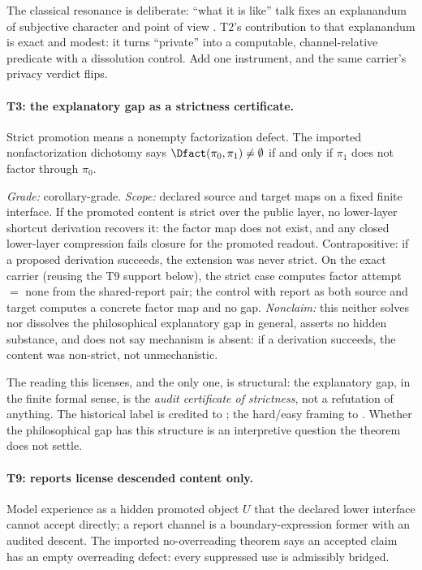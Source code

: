 The classical resonance is deliberate: ``what it is like'' talk fixes an
explanandum of subjective character and point of view \citep{Nagel1974}.
T2's contribution to that explanandum is exact and modest: it turns
``private'' into a computable, channel-relative predicate with a dissolution
control. Add one instrument, and the same carrier's privacy verdict
flips.

\paragraph{T3: the explanatory gap as a strictness certificate.}
Strict promotion means a nonempty factorization defect. The imported
nonfactorization dichotomy says $\Dfact(\pi_0, \pi_1)\neq\emptyset$ if and
only if $\pi_1$ does not factor through $\pi_0$.

\begin{theorem}
\gradeS{} \emph{Grade:} corollary-grade. \emph{Scope:} declared source and
target maps on a fixed finite interface. If the promoted content is strict
over the public layer, no lower-layer shortcut derivation recovers it: the
factor map does not exist, and any closed lower-layer compression fails
closure for the promoted readout. Contrapositive: if a proposed derivation
succeeds, the extension was never strict. On the exact carrier (reusing the
T9 support below), the strict case computes factor attempt $=$ none from the
shared-report pair; the control with report as both source and target
computes a concrete factor map and no gap. \emph{Nonclaim:} this neither
solves nor dissolves the philosophical explanatory gap in general, asserts no
hidden substance, and does not say mechanism is absent: if a derivation
succeeds, the content was non-strict, not unmechanistic.
\end{theorem}

The reading this licenses, and the only one, is structural: the
explanatory gap, in the finite formal sense, is the \emph{audit certificate of
strictness}, not a refutation of anything. The historical label is credited to
\citet{Levine1983}; the hard/easy framing to \citet{Chalmers1995FacingUp}.
Whether the philosophical gap has this structure is an interpretive question
the theorem does not settle.

\paragraph{T9: reports license descended content only.}
Model experience as a hidden promoted object $U$ that the declared lower
interface cannot accept directly; a report channel is a boundary-expression
former with an audited descent. The imported no-overreading theorem says an
accepted claim has an empty overreading defect: every suppressed use is
admissibly bridged.

